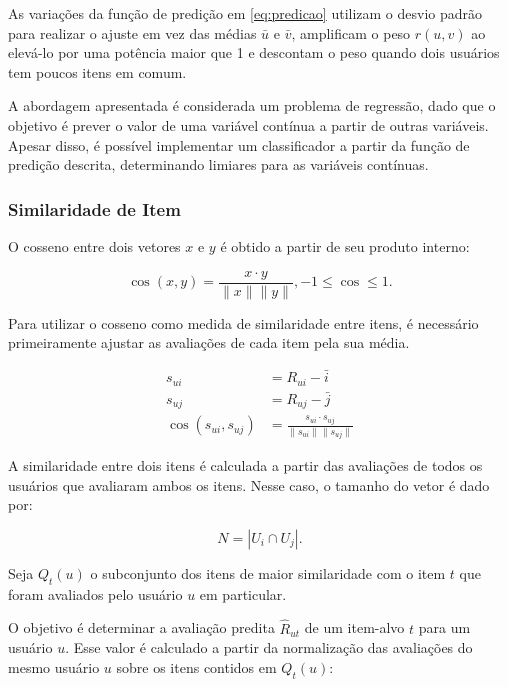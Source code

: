 As variações da função de predição em \ref{eq:predicao} utilizam o desvio padrão
para realizar o ajuste em vez das médias $\bar{u}$ e $\bar{v}$, amplificam o
peso $r(u,v)$ ao elevá-lo por uma potência maior que 1 e descontam o peso quando
dois usuários tem poucos itens em comum.

A abordagem apresentada é considerada um problema de regressão, dado que o objetivo é prever
o valor de uma variável contínua a partir de outras variáveis. Apesar disso, é
possível implementar um classificador a partir da função de predição descrita,
determinando limiares para as variáveis contínuas.

\subsubsection{Similaridade de Item}

O cosseno entre dois vetores $x$ e $y$ é obtido a partir de seu produto interno:

\begin{equation}
    \cos(x,y) = \frac{x \cdot y}{\|x\| \|y\|}, -1 \leq \cos \leq 1.
\end{equation}

Para utilizar o cosseno como medida de similaridade entre itens, é necessário
primeiramente ajustar as avaliações de cada item pela sua média.

\begin{align}
    s_{ui} &= R_{ui} - \bar{i} \\
    s_{uj} &= R_{uj} - \bar{j} \\
    \cos(s_{ui},s_{uj}) &= \frac{s_{ui} \cdot s_{uj}}{\|s_{ui}\| \|s_{uj}\|}
\end{align}

A similaridade entre dois itens é calculada a partir das avaliações de todos os
usuários que avaliaram ambos os itens. Nesse caso, o tamanho do vetor é dado por:

\begin{equation}
    N = |U_i \cap U_j|.
\end{equation}

Seja $Q_t (u)$ o subconjunto dos itens de maior similaridade com o item $t$ que
foram avaliados pelo usuário $u$ em particular.

O objetivo é determinar a avaliação predita $\hat{R}_{ut}$ de um item-alvo $t$ para um usuário
$u$. Esse valor é calculado a partir da normalização das avaliações do mesmo
usuário $u$ sobre os itens contidos em $Q_t (u)$:

